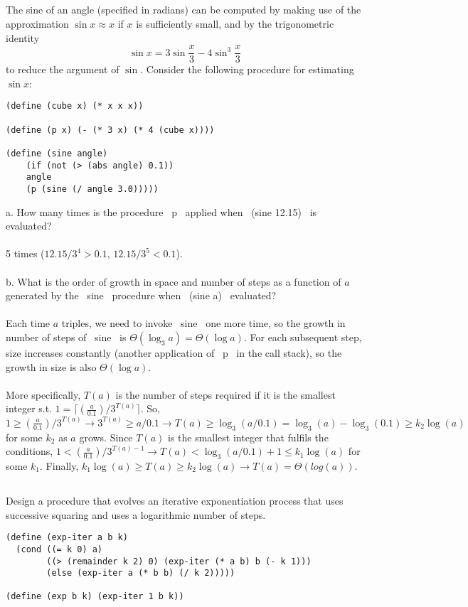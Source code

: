 \documentclass{article}
\begin{document}
\subsection{}
The sine of an angle (specified in radians) can be computed by making use of the approximation $\sin{x} \approx x$ if $x$ is sufficiently small, and by the trigonometric identity
\[ \sin{x} = 3\sin{\frac{x}{3}} - 4\sin^3\frac{x}{3} \]
to reduce the argument of $\sin$.
Consider the following procedure for estimating $\sin{x}$:
\begin{lstlisting}
(define (cube x) (* x x x))

(define (p x) (- (* 3 x) (* 4 (cube x))))

(define (sine angle)
    (if (not (> (abs angle) 0.1))
    angle
    (p (sine (/ angle 3.0)))))
\end{lstlisting}
a. How many times is the procedure ~p~ applied when ~(sine 12.15)~ is evaluated?\\ \\
5 times ($12.15 / 3^4 > 0.1$, $12.15 / 3^5 < 0.1$).\\ \\
b. What is the order of growth in space and number of steps as a function of $a$ generated by the ~sine~ procedure when ~(sine a)~ evaluated?\\ \\
Each time $a$ triples, we need to invoke ~sine~ one more time, so the growth in number of steps of ~sine~ is $\Theta(\log_3 a) = \Theta(\log a)$. For each subsequent step, size increases constantly (another application of ~p~ in the call stack), so the growth in size is also $\Theta(\log a)$.\\ \\
More specifically, $T(a)$ is the number of steps required if it is the smallest integer s.t. $1 = \lceil(\frac{a}{0.1}) / 3^{T(a)}\rceil$. So, $1 \ge (\frac{a}{0.1}) / 3^{T(a)} \rightarrow 3^{T(a)} \ge a/0.1 \rightarrow T(a) \ge \log_3(a/0.1) = \log_3(a) - \log_3(0.1) \ge k_2\log(a)$ for some $k_2$ as $a$ grows. Since $T(a)$ is the smallest integer that fulfils the conditions, $1 < (\frac{a}{0.1}) / 3^{T(a) - 1} \rightarrow T(a) < \log_3(a/0.1) + 1 \le k_1\log(a)$ for some $k_1$. Finally, $k_1 \log(a) \ge T(a) \ge k_2 \log(a) \rightarrow T(a) = \Theta(log(a))$.

\pagebreak
\subsection{}
Design a procedure that evolves an iterative exponentiation process that uses successive squaring and uses a logarithmic number of steps.
\begin{lstlisting}
(define (exp-iter a b k)
  (cond ((= k 0) a)
        ((> (remainder k 2) 0) (exp-iter (* a b) b (- k 1)))
        (else (exp-iter a (* b b) (/ k 2)))))

(define (exp b k) (exp-iter 1 b k))
\end{lstlisting}
\end{document}
